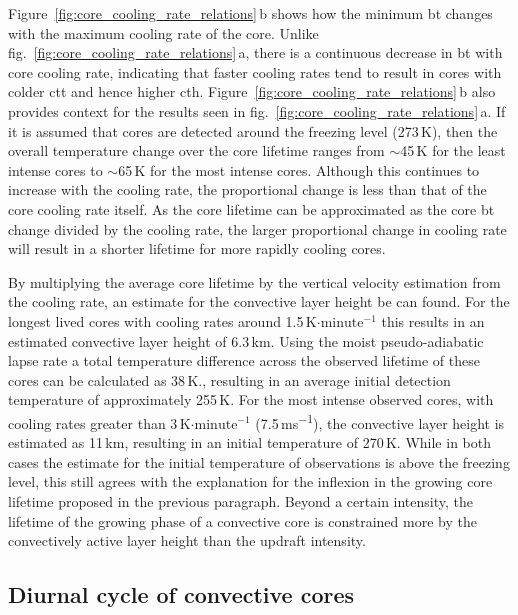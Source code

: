 Figure~\ref{fig:core_cooling_rate_relations}\,b shows how the minimum \acrshort{bt} changes with the maximum cooling rate of the core.
Unlike fig.~\ref{fig:core_cooling_rate_relations}\,a, there is a continuous decrease in \acrshort{bt} with core cooling rate, indicating that faster cooling rates tend to result in cores with colder \acrshort{ctt} and hence higher \acrshort{cth}.
Figure~\ref{fig:core_cooling_rate_relations}\,b also provides context for the results seen in fig.~\ref{fig:core_cooling_rate_relations}\,a.
If it is assumed that cores are detected around the freezing level (273\,\unit{K}), then the overall temperature change over the core lifetime ranges from $\sim$45\,\unit{K} for the least intense cores to $\sim$65\,\unit{K} for the most intense cores.
Although this continues to increase with the cooling rate, the proportional change is less than that of the core cooling rate itself.
As the core lifetime can be approximated as the core \acrshort{bt} change divided by the cooling rate, the larger proportional change in cooling rate will result in a shorter lifetime for more rapidly cooling cores.

By multiplying the average core lifetime by the vertical velocity estimation from the cooling rate, an estimate for the convective layer height be can found.
For the longest lived cores with cooling rates around 1.5\,K$\mathrm{\cdot minute^{-1}}$ this results in an estimated convective layer height of 6.3\,km.
Using the moist pseudo-adiabatic lapse rate a total temperature difference across the observed lifetime of these cores can be calculated as 38\,K., resulting in an average initial detection temperature of approximately 255\,K.
For the most intense observed cores, with cooling rates greater than 3\,K$\mathrm{\cdot minute^{-1}}$ (7.5\,\unit{ms^{-1}}), the convective layer height is estimated as 11\,km, resulting in an initial temperature of 270\,K.
While in both cases the estimate for the initial temperature of observations is above the freezing level, this still agrees with the explanation for the inflexion in the growing core lifetime proposed in the previous paragraph.
Beyond a certain intensity, the lifetime of the growing phase of a convective core is constrained more by the convectively active layer height than the updraft intensity.

\subsection{Diurnal cycle of convective cores}

